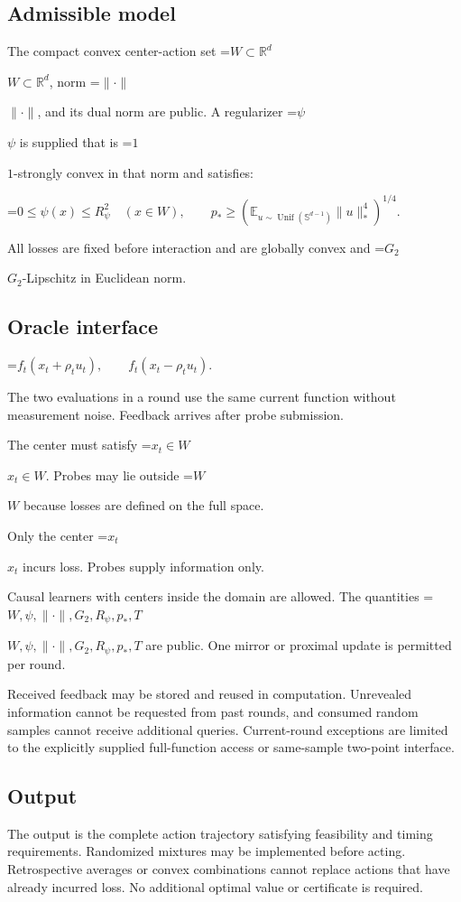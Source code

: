 \documentclass[10pt,a4paper]{article}
\newcommand{\AtlasMath}[1]{\par\begingroup\centering\setbox0=\hbox{$\displaystyle #1$}\ifdim\wd0>1.4\linewidth\typeout{ATLAS WIDE FORMULA: \the\wd0}\fi\ifdim\wd0>\linewidth\resizebox{\linewidth}{!}{\box0}\else\box0\fi\par\endgroup}
\newcommand{\AtlasInlineMath}[1]{\begingroup\setbox0=\hbox{$#1$}\ifdim\wd0>.4\linewidth\endgroup\AtlasMath{#1}\else\endgroup$#1$\fi}
\begin{document}
\subsection{Admissible model}
The compact convex center-action set \AtlasInlineMath{W\subset\mathbb{R}^d}, norm \AtlasInlineMath{\|\cdot\|}, and its dual norm are public. A regularizer \AtlasInlineMath{\psi} is supplied that is \AtlasInlineMath{1}-strongly convex in that norm and satisfies:


\AtlasMath{0\le\psi(x)\le R_\psi^2\quad(x\in W),\qquad p_*\ge\left(\mathbb{E}_{u\sim\operatorname{Unif}(\mathbb{S}^{d-1})}\|u\|_*^4\right)^{1/4}.}


All losses are fixed before interaction and are globally convex and \AtlasInlineMath{G_2}-Lipschitz in Euclidean norm.

\subsection{Oracle interface}

\AtlasMath{f_t(x_t+\rho_tu_t),\qquad f_t(x_t-\rho_tu_t).}


The two evaluations in a round use the same current function without measurement noise. Feedback arrives after probe submission.

The center must satisfy \AtlasInlineMath{x_t\in W}. Probes may lie outside \AtlasInlineMath{W} because losses are defined on the full space.

Only the center \AtlasInlineMath{x_t} incurs loss. Probes supply information only.

Causal learners with centers inside the domain are allowed. The quantities \AtlasInlineMath{W,\psi,\|\cdot\|,G_2,R_\psi,p_*,T} are public. One mirror or proximal update is permitted per round.

Received feedback may be stored and reused in computation. Unrevealed information cannot be requested from past rounds, and consumed random samples cannot receive additional queries. Current-round exceptions are limited to the explicitly supplied full-function access or same-sample two-point interface.

\subsection{Output}
The output is the complete action trajectory satisfying feasibility and timing requirements. Randomized mixtures may be implemented before acting. Retrospective averages or convex combinations cannot replace actions that have already incurred loss. No additional optimal value or certificate is required.
\end{document}
